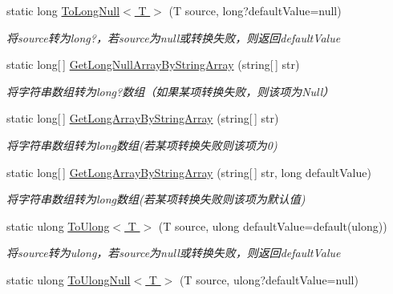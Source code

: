 \begin{DoxyCompactItemize}
static long \hyperlink{class_x_c_l_net_tools_1_1_common_1_1_data_type_convert_a7ee93040c947bfbdbb3c0d78d4aa9226}{To\+Long\+Null$<$ T $>$} (T source, long?default\+Value=null)
\begin{DoxyCompactList}\small\item\em 将source转为long?，若source为null或转换失败，则返回default\+Value \end{DoxyCompactList}\item 
static long\mbox{[}$\,$\mbox{]} \hyperlink{class_x_c_l_net_tools_1_1_common_1_1_data_type_convert_a67fc25be608a1e2f701e986b25bb5821}{Get\+Long\+Null\+Array\+By\+String\+Array} (string\mbox{[}$\,$\mbox{]} str)
\begin{DoxyCompactList}\small\item\em 将字符串数组转为long?数组（如果某项转换失败，则该项为\+Null） \end{DoxyCompactList}\item 
static long\mbox{[}$\,$\mbox{]} \hyperlink{class_x_c_l_net_tools_1_1_common_1_1_data_type_convert_ab6f926a9f94557017048ab3f8e4888ea}{Get\+Long\+Array\+By\+String\+Array} (string\mbox{[}$\,$\mbox{]} str)
\begin{DoxyCompactList}\small\item\em 将字符串数组转为long数组(若某项转换失败则该项为0) \end{DoxyCompactList}\item 
static long\mbox{[}$\,$\mbox{]} \hyperlink{class_x_c_l_net_tools_1_1_common_1_1_data_type_convert_ad786581f0cbd2158d4f345104b15d487}{Get\+Long\+Array\+By\+String\+Array} (string\mbox{[}$\,$\mbox{]} str, long default\+Value)
\begin{DoxyCompactList}\small\item\em 将字符串数组转为long数组(若某项转换失败则该项为默认值) \end{DoxyCompactList}\item 
static ulong \hyperlink{class_x_c_l_net_tools_1_1_common_1_1_data_type_convert_ab4e2db26e84855a2f64cdde1e683e5bc}{To\+Ulong$<$ T $>$} (T source, ulong default\+Value=default(ulong))
\begin{DoxyCompactList}\small\item\em 将source转为ulong，若source为null或转换失败，则返回default\+Value \end{DoxyCompactList}\item 
static ulong \hyperlink{class_x_c_l_net_tools_1_1_common_1_1_data_type_convert_a339b105fc543362020f3bc66cf30b7b3}{To\+Ulong\+Null$<$ T $>$} (T source, ulong?default\+Value=null)

\end{DoxyCompactItemize}
